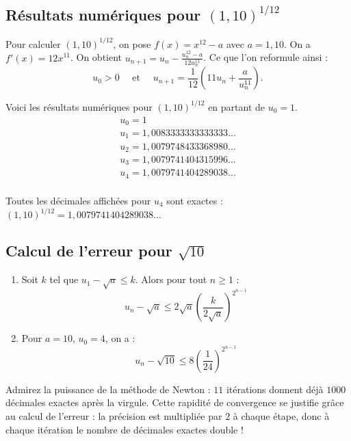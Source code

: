 \documentclass[class=report,crop=false]{standalone}
\begin{document}
\subsection{Résultats numériques pour $(1,10)^{1/12}$}

Pour calculer $(1,10)^{1/12}$, on pose $f(x)=x^{12}-a$ avec $a=1,10$.
On a $f'(x)=12x^{11}$.
On obtient $u_{n+1} = u_n - \frac{u_n^{12}-a}{12u_n^{11}}$. Ce que l'on reformule ainsi :
$$u_0>0 \quad \text{ et } \quad u_{n+1} = \frac1{12} \left(11u_n+\frac{a}{u_n^{11}}\right).$$

Voici les résultats numériques pour $(1,10)^{1/12}$ en partant de $u_0=1$.
$$
\begin{array}{l}
  u_0 = 1     \\
  u_1 = 1,0083333333333333 \ldots \\
  u_2 = 1,0079748433368980\ldots \\
  u_3 = 1,0079741404315996 \ldots \\
  u_4 = 1,0079741404289038 \ldots \\
\end{array}
$$

Toutes les décimales affichées pour $u_4$ sont exactes :
$(1,10)^{1/12}=1,0079741404289038\ldots$

\subsection{Calcul de l'erreur pour $\sqrt{10}$}

\begin{proposition}
\begin{enumerate}
  \item Soit $k$ tel que $u_1-\sqrt a\le k$. Alors pour tout $n\ge 1$ :
  $$u_n - \sqrt{a} \le 2\sqrt{a} \left( \frac{k}{2\sqrt{a}} \right)^{2^{n-1}}$$

  \item Pour $a=10$, $u_0=4$, on a :
  $$u_n - \sqrt{10} \le 8 \left(\frac{1}{24} \right)^{2^{n-1}}$$
\end{enumerate}
\end{proposition}

Admirez la puissance de la méthode de Newton : $11$ itérations donnent déjà $1000$ décimales
exactes après la virgule. Cette rapidité de convergence se justifie grâce
au calcul de l'erreur : la précision est multipliée par $2$ à chaque étape, donc à chaque
itération le nombre de décimales exactes double !
\end{document}
